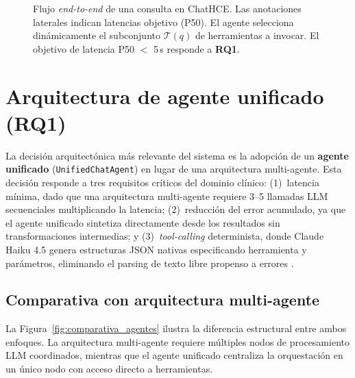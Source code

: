\begin{figure}[htbp]
{%
}%
\caption{Flujo \textit{end-to-end} de una consulta en ChatHCE. Las anotaciones laterales indican latencias objetivo (P50). El agente selecciona dinámicamente el subconjunto $\mathcal{T}(q)$ de herramientas a invocar. El objetivo de latencia P50 $<$ 5\,s responde a \textbf{RQ1}.}
\label{fig:flujo_end2end}
\end{figure}

\section{Arquitectura de agente unificado (\acs{RQ}1)}
\label{sec:agente_unificado}

La decisión arquitectónica más relevante del sistema es la adopción de un \textbf{agente unificado} (\texttt{UnifiedChatAgent}) en lugar de una arquitectura multi-agente. Esta decisión responde a tres requisitos críticos del dominio clínico: (1)~latencia mínima, dado que una arquitectura multi-agente requiere 3--5 llamadas \ac{LLM} secuenciales multiplicando la latencia; (2)~reducción del error acumulado, ya que el agente unificado sintetiza directamente desde los resultados sin transformaciones intermedias; y (3)~\textit{tool-calling} determinista, donde Claude Haiku 4.5 genera estructuras \ac{JSON} nativas especificando herramienta y parámetros, eliminando el parsing de texto libre propenso a errores \parencite{Wang2024SurveyAgents}.

\subsection{Comparativa con arquitectura multi-agente}

La Figura~\ref{fig:comparativa_agentes} ilustra la diferencia estructural entre ambos enfoques. La arquitectura multi-agente requiere múltiples nodos de procesamiento \ac{LLM} coordinados, mientras que el agente unificado centraliza la orquestación en un único nodo con acceso directo a herramientas.

